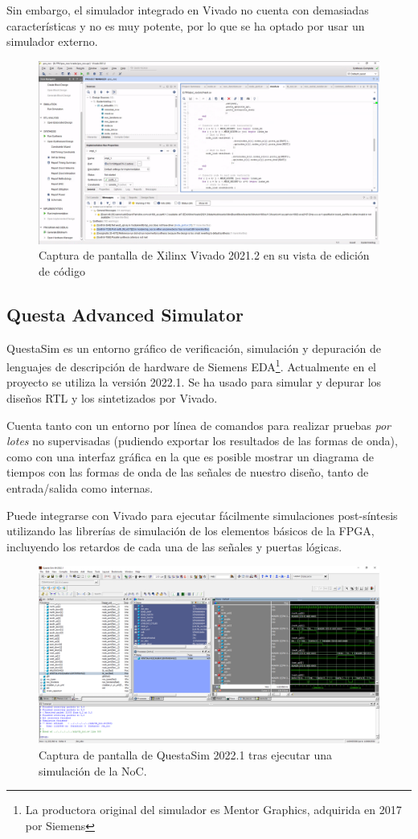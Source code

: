 Sin embargo, el simulador integrado en Vivado no cuenta con demasiadas características y no es muy potente, por lo que se ha optado por usar un simulador externo.

\begin{figure}[h]
    \centering
    \includegraphics[width=\linewidth]{images/screencaps/vivado.png}
    \caption{Captura de pantalla de Xilinx Vivado 2021.2 en su vista de edición de código}
    \label{fig:screencap_vivado}
\end{figure}

\subsection{Questa Advanced Simulator}

QuestaSim es un entorno gráfico de verificación, simulación y depuración de lenguajes de descripción de hardware de Siemens EDA\footnote{La productora original del simulador es Mentor Graphics, adquirida en 2017 por Siemens}.
Actualmente en el proyecto se utiliza la versión 2022.1. Se ha usado para simular y depurar los diseños RTL y los sintetizados por Vivado.

Cuenta tanto con un entorno por línea de comandos para realizar pruebas \textit{por lotes} no supervisadas (pudiendo exportar los resultados de las formas de onda), como con una interfaz gráfica en la que es posible mostrar un diagrama de tiempos con las formas de onda de las señales de nuestro diseño, tanto de entrada/salida como internas.

Puede integrarse con Vivado para ejecutar fácilmente simulaciones post-síntesis utilizando las librerías de simulación de los elementos básicos de la FPGA, incluyendo los retardos de cada una de las señales y puertas lógicas.

\begin{figure}[h]
    \centering
    \includegraphics[width=\linewidth]{images/screencaps/questasim.png}
    \caption{Captura de pantalla de QuestaSim 2022.1 tras ejecutar una simulación de la NoC.}
    \label{fig:screencap_questasim}
\end{figure}